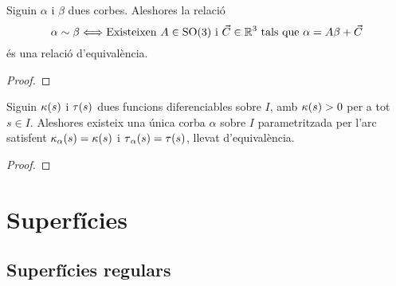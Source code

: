 \documentclass[../../Main.tex]{subfiles}
\begin{document}
	\begin{lemma}
		\label{lemma:Teorema Fonamental de la teoria local de corbes}
		Siguin \(\alpha\) i \(\beta\) dues corbes. Aleshores la relació
		\[
		    \alpha\sim\beta \Longleftrightarrow \text{Existeixen }A\in\operatorname{SO}(3)\text{ i }\vec{C}\in\mathbb{R}^{3}\text{ tals que }\alpha=A\beta+\vec{C}
		\]
		és una relació d'equivalència.
		\begin{proof}
		\end{proof}
	\end{lemma}
	\begin{theorem}
		\label{thm:Teorema Fonamental de la teoria local del corbes}
		Siguin \(\operatorname{\kappa}(s)\) i \(\operatorname{\tau}(s)\) dues funcions diferenciables sobre \(I\), amb \(\operatorname{\kappa}(s)>0\) per a tot \(s\in I\). Aleshores existeix una única corba \(\alpha\) sobre \(I\) parametritzada per l'arc satisfent \(\operatorname{\kappa}_{\alpha}(s)=\operatorname{\kappa}(s)\) i \(\operatorname{\tau}_{\alpha}(s)=\operatorname{\tau}(s)\), llevat d'equivalència. %
		\begin{proof}
		\end{proof}
	\end{theorem}
\chapter{Superfícies}
\section{Superfícies regulars}
\end{document}
